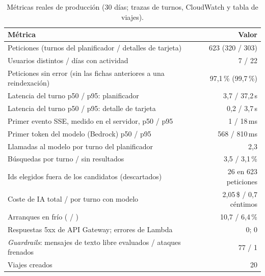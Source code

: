 \begin{table}[h]
\centering\scriptsize
\caption{Métricas reales de producción (30 días; trazas de turnos, CloudWatch y tabla de viajes).}\label{tab:produccion}
\begin{tabularx}{\columnwidth}{@{}Yr@{}}
\toprule
\textbf{Métrica} & \textbf{Valor} \\
\midrule
Peticiones (turnos del planificador / detalles de tarjeta) & 623 (320 / 303) \\
Usuarios distintos / días con actividad & 7 / 22 \\
Peticiones sin error (sin las fichas anteriores a una reindexación) & 97,1\,\% (99,7\,\%) \\
Latencia del turno p50 / p95: planificador & 3,7 / 37,2\,s \\
Latencia del turno p50 / p95: detalle de tarjeta & 0,2 / 3,7\,s \\
Primer evento SSE, medido en el servidor, p50 / p95 & 1 / 18\,ms \\
Primer token del modelo (Bedrock) p50 / p95 & 568 / 810\,ms \\
Llamadas al modelo por turno del planificador & 2,3 \\
Búsquedas por turno / sin resultados & 3,5 / 3,1\,\% \\
Ids elegidos fuera de los candidatos (descartados) & 26 en 623 peticiones \\
Coste de IA total / por turno con modelo & 2,05\,\$ / 0,7 céntimos \\
Arranques en frío ( / ) & 10,7 / 6,4\,\% \\
Respuestas 5xx de API Gateway; errores de Lambda & 0; 0 \\
\emph{Guardrails}: mensajes de texto libre evaluados / ataques frenados & 77 / 1 \\
Viajes creados & 20 \\
\bottomrule
\end{tabularx}
\end{table}
